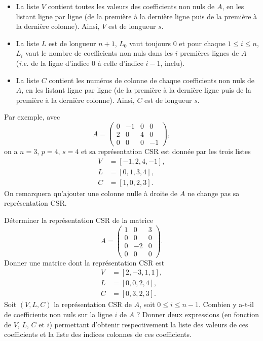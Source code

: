 \begin{itemize}
    \item La liste $V$ contient toutes les valeurs des coefficients non nuls de $A$, en les listant ligne par ligne (de la première à la dernière ligne puis de la première à la dernière colonne). Ainsi, $V$ est de longueur $s$. 
    \item La liste $L$ est de longueur $n+1$, $L_0$ vaut toujours $0$ et pour chaque $1\leq i \leq n$, $L_i$ vaut le nombre de coefficients non nuls dans les $i$ premières lignes de $A$ (\emph{i.e.} de la ligne d'indice $0$ à celle d'indice $i-1$, inclu). 
    \item La liste $C$ contient les numéros de colonne de chaque coefficients non nuls de $A$, en les listant ligne par ligne (de la première à la dernière ligne puis de la première à la dernière colonne). Ainsi, $C$ est de longueur $s$.
\end{itemize}
Par exemple, avec
\begin{equation*}
    A = \begin{pmatrix} 0 & -1 & 0 & 0 \\ 2 & 0 & 4 & 0 \\ 0 & 0 & 0 & -1  \end{pmatrix},
\end{equation*}
on a $n = 3$, $p = 4$, $s = 4$ et sa représentation CSR est donnée par les trois listes 
\begin{align*}
    V &= [-1,2,4,-1], \\
    L &= [0,1,3,4], \\
    C &= [1,0,2,3].
\end{align*}
On remarquera qu'ajouter une colonne nulle à droite de $A$ ne change pas sa représentation CSR. 

\bigskip{}

\question{} Déterminer la représentation CSR de la matrice 
\begin{equation*}
    A = \begin{pmatrix} 1 & 0 & 3 \\ 0 & 0 & 0 \\ 0 & -2 & 0 \\ 0 & 0 & 0 \end{pmatrix}.
\end{equation*}
\question{} Donner une matrice dont la représentation CSR est 
\begin{align*}
    V &= [2,-3,1,1], \\
    L &= [0,0,2,4], \\
    C &= [0,3,2,3].
\end{align*}
\question{} Soit $(V,L,C)$ la représentation CSR de $A$, soit $0 \leq i \leq n-1$. Combien y a-t-il de coefficients non nuls sur la ligne \no$i$ de $A$ ? Donner deux expressions \python{} (en fonction de $V$, $L$, $C$ et $i$) permettant d'obtenir respectivement la liste des valeurs de ces coefficients et la liste des indices colonnes de ces coefficients. 

